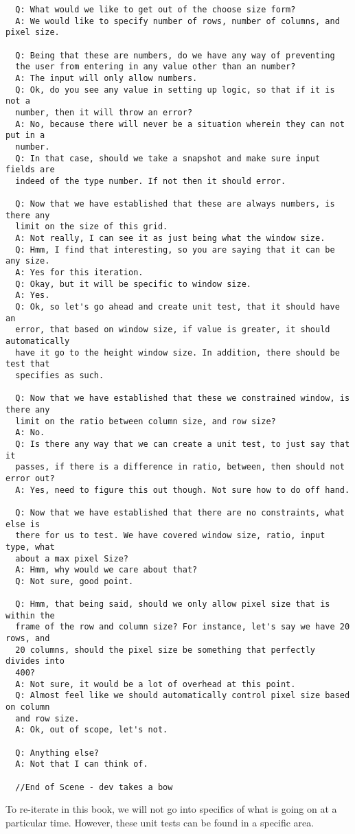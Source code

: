 \begin{verbatim}
  Q: What would we like to get out of the choose size form?
  A: We would like to specify number of rows, number of columns, and pixel size.

  Q: Being that these are numbers, do we have any way of preventing
  the user from entering in any value other than an number?
  A: The input will only allow numbers.
  Q: Ok, do you see any value in setting up logic, so that if it is not a
  number, then it will throw an error?
  A: No, because there will never be a situation wherein they can not put in a
  number.
  Q: In that case, should we take a snapshot and make sure input fields are
  indeed of the type number. If not then it should error.

  Q: Now that we have established that these are always numbers, is there any
  limit on the size of this grid.
  A: Not really, I can see it as just being what the window size.
  Q: Hmm, I find that interesting, so you are saying that it can be any size.
  A: Yes for this iteration.
  Q: Okay, but it will be specific to window size.
  A: Yes.
  Q: Ok, so let's go ahead and create unit test, that it should have an
  error, that based on window size, if value is greater, it should automatically
  have it go to the height window size. In addition, there should be test that
  specifies as such.

  Q: Now that we have established that these we constrained window, is there any
  limit on the ratio between column size, and row size?
  A: No.
  Q: Is there any way that we can create a unit test, to just say that it
  passes, if there is a difference in ratio, between, then should not error out?
  A: Yes, need to figure this out though. Not sure how to do off hand.

  Q: Now that we have established that there are no constraints, what else is
  there for us to test. We have covered window size, ratio, input type, what
  about a max pixel Size?
  A: Hmm, why would we care about that?
  Q: Not sure, good point.

  Q: Hmm, that being said, should we only allow pixel size that is within the
  frame of the row and column size? For instance, let's say we have 20 rows, and
  20 columns, should the pixel size be something that perfectly divides into
  400?
  A: Not sure, it would be a lot of overhead at this point.
  Q: Almost feel like we should automatically control pixel size based on column
  and row size.
  A: Ok, out of scope, let's not.

  Q: Anything else?
  A: Not that I can think of.

  //End of Scene - dev takes a bow
\end{verbatim}

To re-iterate in this book, we will not go into specifics of what is going on
at a particular time. However, these unit tests can be found in a specific area.
